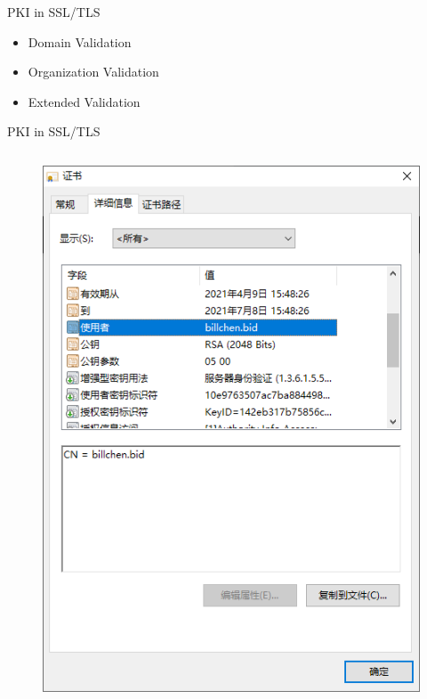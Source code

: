\documentclass[UTF8]{ctexbeamer}
\begin{document}
\begin{frame}{PKI in SSL/TLS}
    \begin{itemize}
        \item Domain Validation
        \item Organization Validation
        \item Extended Validation
    \end{itemize}
\end{frame}
\begin{frame}{PKI in SSL/TLS}
    \begin{columns}
        \begin{column}{0.25\textwidth}
            \begin{figure}
                \centering
                \includegraphics[width=\textwidth]{dv.png}
            \end{figure}
        \end{column}

\end{columns}
\end{frame}
\end{document}
